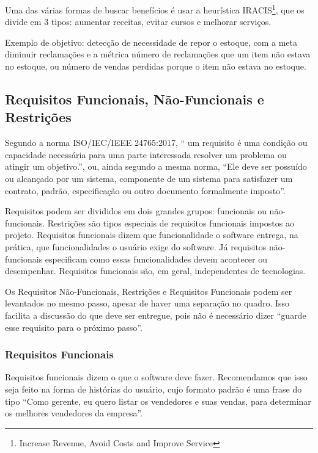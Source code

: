 \documentclass{article}
\begin{document}
Uma das várias formas de buscar benefícios é usar a heurística IRACIS\footnote{Increase Revenue, Avoid Costs and Improve Service}, que os divide em 3 tipos: aumentar receitas, evitar cursos e melhorar serviços.

Exemplo de objetivo: detecção de necessidade de repor o estoque, com a meta diminuir reclamações e a métrica número de reclamações que um item não estava no estoque, ou número de vendas perdidas porque o item não estava no estoque.

\subsection{Requisitos Funcionais, Não-Funcionais e Restrições}

Segundo a norma ISO/IEC/IEEE 24765:2017, `` um requisito é uma condição ou capacidade necessária para uma parte interessada resolver um problema ou atingir um objetivo.'', ou, ainda segundo a mesma norma, ``Ele deve ser possuído ou alcançado por um sistema, componente de um sistema para satisfazer um contrato, padrão, especificação ou outro documento formalmente imposto''\citep{IEEE:24765:2017}.

Requisitos podem ser divididos em dois grandes grupos: funcionais ou não-funcionais. Restrições são tipos especiais de requisitos funcionais impostos ao projeto. Requisitos funcionais dizem que funcionalidade o software entrega, na prática, que funcionalidades o usuário exige do software. Já requisitos não-funcionais especificam como essas funcionalidades devem acontecer ou desempenhar. Requisitos funcionais são, em geral, independentes de tecnologias.

Os Requisitos Não-Funcionais, Restrições e Requisitos Funcionais podem ser levantados no mesmo passo, apesar de haver uma separação no quadro. Isso facilita a discussão do que deve ser entregue, pois não é necessário dizer ``guarde esse requisito para o próximo passo''. 

\subsubsection{Requisitos Funcionais}

Requisitos funcionais dizem o que o software deve fazer. Recomendamos que isso seja feito na forma de histórias do usuário, cujo formato padrão é uma frase do tipo ``Como gerente, eu quero listar os vendedores e suas vendas, para determinar os melhores vendedores da empresa''\citep{mike:user:stories}.
\end{document}
